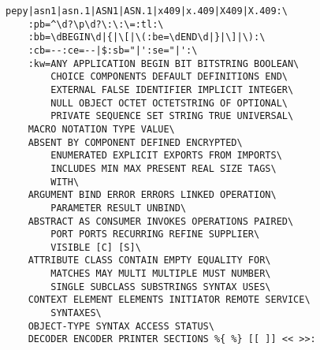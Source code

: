 \begin{verbatim}
pepy|asn1|asn.1|ASN1|ASN.1|x409|x.409|X409|X.409:\
	:pb=^\d?\p\d?\:\:\=:tl:\
	:bb=\dBEGIN\d|{|\[|\(:be=\dEND\d|}|\]|\):\
	:cb=--:ce=--|$:sb="|':se="|':\
	:kw=ANY APPLICATION BEGIN BIT BITSTRING BOOLEAN\
	    CHOICE COMPONENTS DEFAULT DEFINITIONS END\
	    EXTERNAL FALSE IDENTIFIER IMPLICIT INTEGER\
	    NULL OBJECT OCTET OCTETSTRING OF OPTIONAL\
	    PRIVATE SEQUENCE SET STRING TRUE UNIVERSAL\
	MACRO NOTATION TYPE VALUE\
	ABSENT BY COMPONENT DEFINED ENCRYPTED\
	    ENUMERATED EXPLICIT EXPORTS FROM IMPORTS\
	    INCLUDES MIN MAX PRESENT REAL SIZE TAGS\
	    WITH\
	ARGUMENT BIND ERROR ERRORS LINKED OPERATION\
	    PARAMETER RESULT UNBIND\
	ABSTRACT AS CONSUMER INVOKES OPERATIONS PAIRED\
	    PORT PORTS RECURRING REFINE SUPPLIER\
	    VISIBLE [C] [S]\
	ATTRIBUTE CLASS CONTAIN EMPTY EQUALITY FOR\
	    MATCHES MAY MULTI MULTIPLE MUST NUMBER\
	    SINGLE SUBCLASS SUBSTRINGS SYNTAX USES\
	CONTEXT ELEMENT ELEMENTS INITIATOR REMOTE SERVICE\
	    SYNTAXES\
	OBJECT-TYPE SYNTAX ACCESS STATUS\
	DECODER ENCODER PRINTER SECTIONS %{ %} [[ ]] << >>:
\end{verbatim}
